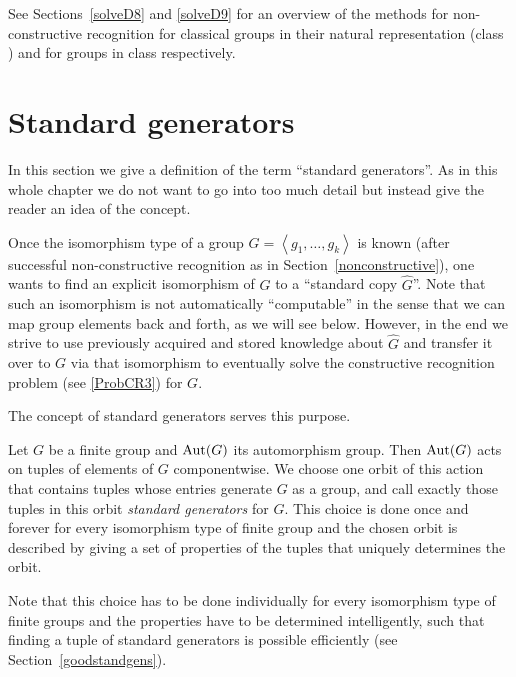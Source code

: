 See Sections~\ref{solveD8} and \ref{solveD9} for an overview of the
methods for non-constructive recognition for classical
groups in their natural representation (class ) and for groups in class 
respectively.

\section{Standard generators}
\label{standardgens}
% 

In this section we give a definition of the term
``standard generators''. As in this whole chapter we do not want to go
into too much detail but instead give the reader an idea of the
concept.

Once the isomorphism type of a group $G = \left< g_1, \ldots,
g_k\right>$ is known (after successful non-con\-struc\-tive recognition as in
Section~\ref{nonconstructive}), one wants to find an explicit
isomorphism of $G$ to a ``standard copy $\hat G$''. Note that such an
isomorphism is not automatically ``computable'' in the sense that 
we can map group elements back and forth, as we will see below.
However, in the end we strive to use previously acquired and stored
knowledge about $\hat G$ and transfer it over to $G$ via that
isomorphism to eventually solve the constructive recognition problem (see
\ref{ProbCR3}) for $G$.

The concept of standard generators serves this purpose.

\begin{Def}
% 
    Let $G$ be a finite group and $\Aut(G)$ its automorphism group. Then
    $\Aut(G)$ acts on tuples of elements of $G$ componentwise. We choose
    one orbit of this action that contains tuples whose entries
    generate $G$ as a group, and call exactly those tuples in this
    orbit \emph{standard generators} for $G$. This choice is done once
    and forever for every isomorphism type of finite group and the
    chosen orbit is described by giving a set of properties of the
    tuples that uniquely determines the orbit.
\end{Def}

\begin{Rem}
Note that this choice has to be done individually for every
isomorphism type of finite groups and the properties have to be
determined intelligently, such that finding a tuple of standard
generators is possible efficiently (see Section~\ref{goodstandgens}).
\end{Rem}

